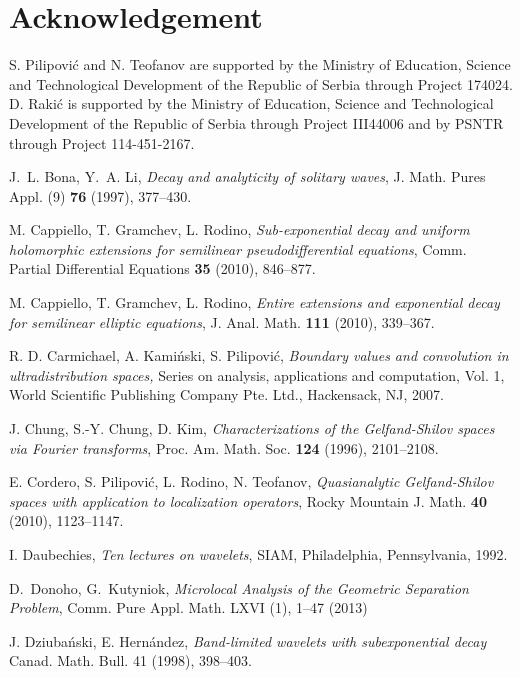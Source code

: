 \documentclass[reqno,12pt]{amsart}
\theoremstyle{plain}
\theoremstyle{definition}
\theoremstyle{remark}
\begin{document}
\section*{Acknowledgement}

S. Pilipovi\'{c} and N. Teofanov are supported by the Ministry of
Education, Science and Technological Development of the Republic of
Serbia through Project 174024. D. Raki\'{c} is supported by the
Ministry of Education, Science and Technological Development of the
Republic of Serbia through Project III44006 and by PSNTR through
Project 114-451-2167.

\begin{thebibliography}{99}

 J.~L. Bona,  Y.~A. Li,
\textit{Decay and analyticity of solitary waves},
J. Math. Pures Appl. (9) \textbf{76} (1997), 377--430.

 M. Cappiello, T. Gramchev, L. Rodino,
\textit{Sub-exponential decay and uniform holomorphic extensions for semilinear pseudodifferential equations},
Comm. Partial Differential Equations \textbf{35}  (2010), 846--877.

 M. Cappiello, T. Gramchev, L. Rodino,
\textit{Entire extensions and exponential decay for semilinear elliptic equations},
J. Anal. Math. \textbf{111} (2010), 339--367.

 R. D. Carmichael, A. Kami\'{n}ski, S. Pilipovi\'c,
\textit{Boundary values and convolution in ultradistribution spaces,} Series on analysis, applications and computation, Vol. 1, World Scientific Publishing Company Pte. Ltd., Hackensack, NJ, 2007.

J. Chung, S.-Y. Chung, D. Kim, \textit{{C}haracterizations
of the {G}elfand-{S}hilov spaces via {F}ourier transforms}, Proc.
Am. Math. Soc.  \textbf{124} (1996), 2101--2108.

 E. Cordero, S. Pilipovi\'{c}, L. Rodino, N. Teofanov,
\textit{Quasianalytic Gelfand-Shilov spaces with application to localization operators},
Rocky Mountain J. Math. \textbf{40} (2010), 1123--1147.

 I. Daubechies, \textit{Ten lectures on wavelets},
SIAM, Philadelphia, Pennsylvania, 1992.

D.~Donoho, G.~Kutyniok,
\textit{Microlocal Analysis of the Geometric Separation Problem},
Comm. Pure Appl. Math. {LXVI (1)}, 1--47 (2013)

 J. Dziuba\'nski, E. Hern\'andez,
\textit{Band-limited wavelets with subexponential decay} Canad.
Math. Bull. 41 (1998), 398--403.


\end{thebibliography}
\end{document}

